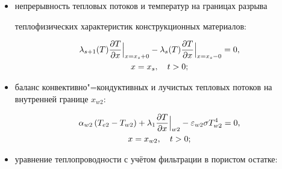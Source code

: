 \begin{itemize}
\begin{gather}
\notag

x_{s-1} <x \le x_s,



\quad

t>0;

\end{gather}



\item непрерывность тепловых потоков и температур на границах разрыва

теплофизических характеристик  конструкционных материалов:

\begin{gather}

\label{kuzn11:eq6}

\lambda _{s+1} ( T ) \frac{\partial T}{\partial x} \Bigr|_{x=x_s +0} - \lambda_s ( T )\frac{\partial T}{\partial x} \Bigr|_{x = x_s - 0} =0,

\\

\notag

x=x_s,



\quad 

t>0;

\end{gather}



\item 

баланс конвективно"=кондуктивных и лучистых тепловых потоков на внутренней границе $x_{w2}$:

\begin{gather}

\label{kuzn11:eq7}

\alpha_{w2} \left(T_{e2} -T_{w2} \right)+\lambda_1 \frac{\partial T}{\partial x} \Bigr|_{w2} - \varepsilon_{w2} \sigma T_{w2}^4 =0,

\\ \notag x=x_{w2},\quad t>0;

\end{gather}



\item 

уравнение теплопроводности с учётом фильтрации в пористом остатке:

\begin{gather}


\end{gather}
\end{itemize}
